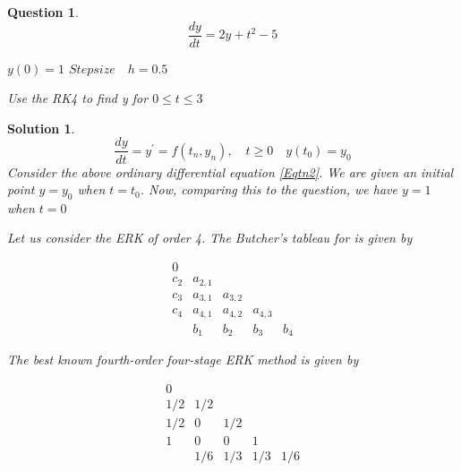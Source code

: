 \documentclass[12pt,a4paper]{article}
\newtheorem{question}[theorem]{Question}
\newtheorem{solution}[theorem]{Solution}
\begin{document}
\begin{question}
\begin{equation}
\frac{dy}{dt} = 2y + t^2 - 5
\end{equation}
\begin{center}
$ y(0)=1 $ \qquad
$Step size \quad h = 0.5 $

Use the RK4 to find y for $0\leq t \leq 3$
\end{center}

\end{question}
\hspace{2pt}

\begin{solution}
\begin{equation}\label{Eqtn2}\tag{2}
\frac{dy}{dt} = y^\prime = f(t_n,y_n), \quad
 t\geq 0 \quad y(t_0)= y_0 
\end{equation}
Consider the above ordinary differential equation \ref{Eqtn2}. We are given an initial point $y = y_0$ when $ t=t_0 $. Now, comparing this to the question, we have $y = 1 $ when $ t=0 $

\noindent
Let us consider the ERK of order 4. The Butcher's tableau for is given by

\begin{equation}\label{table1}\tag{1.1}
  \begin{array}{c|cccc}
    0        \\
    c_2       & a_{2,1}  \\
    c_3       & a_{3,1}  &  a_{3,2}  \\
    c_4       & a_{4,1}  &  a_{4,2}   & a_{4,3} \\
    \hline
    \,        & b_1      & b_2       &b_3     & b_4
  \end{array}
\end{equation}

\noindent
The best known fourth-order four-stage ERK method is given by

\begin{equation}\label{table2}\tag{1.2}
  \begin{array}{c|cccc}
    0        \\
    1/2     & 1/2  \\
    1/2     & 0  &  1/2  \\
    1       & 0  &  0   & 1 \\
    \hline
    \,        & 1/6      & 1/3      &1/3     & 1/6
  \end{array}
\end{equation}


\end{solution}
\end{document}
